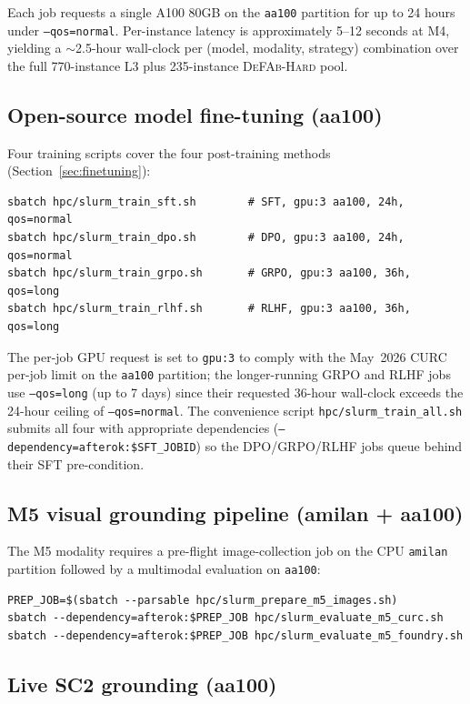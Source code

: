 \documentclass{article}
\theoremstyle{definition}
\begin{document}
Each job requests a single A100 80GB on the \texttt{aa100} partition for up to 24 hours under \texttt{--qos=normal}. Per-instance latency is approximately 5--12 seconds at M4, yielding a $\sim$2.5-hour wall-clock per (model, modality, strategy) combination over the full 770-instance L3 plus 235-instance \textsc{DeFAb-Hard} pool.

\subsection{Open-source model fine-tuning (aa100)}

Four training scripts cover the four post-training methods (Section~\ref{sec:finetuning}):

\begin{verbatim}
sbatch hpc/slurm_train_sft.sh        # SFT, gpu:3 aa100, 24h, qos=normal
sbatch hpc/slurm_train_dpo.sh        # DPO, gpu:3 aa100, 24h, qos=normal
sbatch hpc/slurm_train_grpo.sh       # GRPO, gpu:3 aa100, 36h, qos=long
sbatch hpc/slurm_train_rlhf.sh       # RLHF, gpu:3 aa100, 36h, qos=long
\end{verbatim}

The per-job GPU request is set to \texttt{gpu:3} to comply with the May~2026 CURC per-job limit on the \texttt{aa100} partition; the longer-running GRPO and RLHF jobs use \texttt{--qos=long} (up to 7 days) since their requested 36-hour wall-clock exceeds the 24-hour ceiling of \texttt{--qos=normal}. The convenience script \texttt{hpc/slurm\_train\_all.sh} submits all four with appropriate dependencies (\texttt{--dependency=afterok:\$SFT\_JOBID}) so the DPO/GRPO/RLHF jobs queue behind their SFT pre-condition.

\subsection{M5 visual grounding pipeline (amilan + aa100)}

The M5 modality requires a pre-flight image-collection job on the CPU \texttt{amilan} partition followed by a multimodal evaluation on \texttt{aa100}:

\begin{verbatim}
PREP_JOB=$(sbatch --parsable hpc/slurm_prepare_m5_images.sh)
sbatch --dependency=afterok:$PREP_JOB hpc/slurm_evaluate_m5_curc.sh
sbatch --dependency=afterok:$PREP_JOB hpc/slurm_evaluate_m5_foundry.sh
\end{verbatim}

\subsection{Live SC2 grounding (aa100)}
\end{document}
